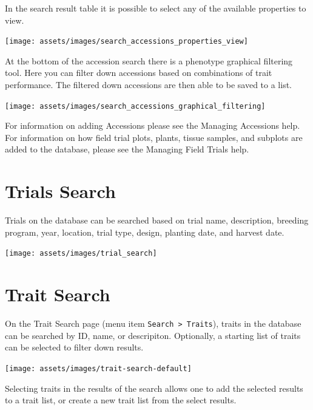 \documentclass[
  12pt,
]{book}
\begin{document}
In the search result table it is possible to select any of the available properties to view.

\begin{center}\texttt{[image: assets/images/search\_accessions\_properties\_view]} \end{center}

At the bottom of the accession search there is a phenotype graphical filtering tool. Here you can filter down accessions based on combinations of trait performance. The filtered down accessions are then able to be saved to a list.

\begin{center}\texttt{[image: assets/images/search\_accessions\_graphical\_filtering]} \end{center}

For information on adding Accessions please see the Managing Accessions help. For information on how field trial plots, plants, tissue samples, and subplots are added to the database, please see the Managing Field Trials help.

\hypertarget{trials-search}{%
\section{Trials Search}\label{trials-search}}

Trials on the database can be searched based on trial name, description, breeding program, year, location, trial type, design, planting date, and harvest date.

\begin{center}\texttt{[image: assets/images/trial\_search]} \end{center}

\hypertarget{trait-search}{%
\section{Trait Search}\label{trait-search}}

On the Trait Search page (menu item \texttt{Search\ \textgreater{}\ Traits}), traits in the database can be searched by ID, name, or descripiton. Optionally, a starting list of traits can be selected to filter down results.

\begin{center}\texttt{[image: assets/images/trait-search-default]} \end{center}

Selecting traits in the results of the search allows one to add the selected results to a trait list, or create a new trait list from the select results.
\end{document}
